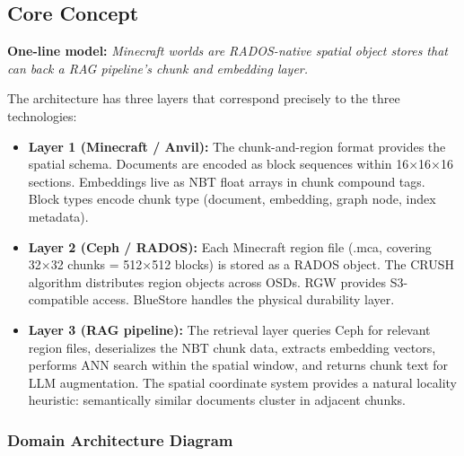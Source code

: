 \documentclass[11pt,letterpaper]{article}
\begin{document}
\subsection{Core Concept}

\textbf{One-line model:} \textit{Minecraft worlds are RADOS-native spatial object stores that can back a RAG pipeline's chunk and embedding layer.}

The architecture has three layers that correspond precisely to the three technologies:

\begin{itemize}
  \item \textbf{Layer 1 (Minecraft / Anvil):} The chunk-and-region format provides the spatial schema. Documents are encoded as block sequences within 16×16×16 sections. Embeddings live as NBT float arrays in chunk compound tags. Block types encode chunk type (document, embedding, graph node, index metadata).
  \item \textbf{Layer 2 (Ceph / RADOS):} Each Minecraft region file (.mca, covering 32×32 chunks = 512×512 blocks) is stored as a RADOS object. The CRUSH algorithm distributes region objects across OSDs. RGW provides S3-compatible access. BlueStore handles the physical durability layer.
  \item \textbf{Layer 3 (RAG pipeline):} The retrieval layer queries Ceph for relevant region files, deserializes the NBT chunk data, extracts embedding vectors, performs ANN search within the spatial window, and returns chunk text for LLM augmentation. The spatial coordinate system provides a natural locality heuristic: semantically similar documents cluster in adjacent chunks.
\end{itemize}

\subsubsection{Domain Architecture Diagram}
\end{document}
